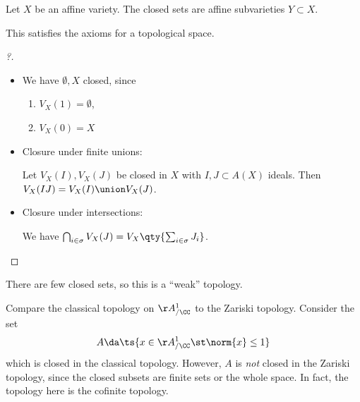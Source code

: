 \begin{definition}

Let \(X\) be an affine variety. The closed sets are affine subvarieties
\(Y\subset X\).

\end{definition}

\begin{proposition}

This satisfies the axioms for a topological space.

\end{proposition}

\begin{proof}[?]

\envlist

\begin{itemize}
\item
  We have \(\emptyset, X\) closed, since

  \begin{enumerate}
  \def\labelenumi{\arabic{enumi}.}
  \tightlist
  \item
    \(V_X(1) = \emptyset\),
  \item
    \(V_X(0) = X\)
  \end{enumerate}
\item
  Closure under finite unions:

  Let \(V_X(I), V_X(J)\) be closed in \(X\) with \(I, J \subset A(X)\)
  ideals. Then \(V_X(IJ) = V_X(I) \union V_X(J)\).
\item
  Closure under intersections:

  We have
  \(\bigcap_{i\in \sigma} V_X(J) = V_X\qty{ \sum_{i\in \sigma} J_i}\).
\end{itemize}

\end{proof}

\begin{remark}

There are few closed sets, so this is a ``weak'' topology.

\end{remark}

\begin{example}

Compare the classical topology on \(\AA^1_{/\CC}\) to the Zariski
topology. Consider the set
\begin{align*}
A\da \ts{x\in \AA^1_{/\CC} \st \norm{x} \leq 1}
\end{align*} which is closed in the classical topology. However, \(A\)
is \emph{not} closed in the Zariski topology, since the closed subsets
are finite sets or the whole space. In fact, the topology here is the
cofinite topology.

\end{example}

